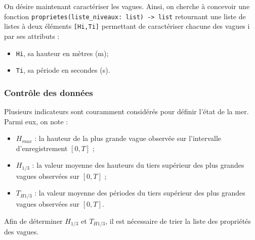 
On désire maintenant caractériser les vagues.
Ainsi, on cherche à concevoir une fonction \texttt{proprietes(liste\_niveaux: list) -> list} retournant une liste de
listes à deux éléments \texttt{[Hi,Ti]} permettant de caractériser chacune des vagues i par ses attributs :
\begin{itemize}
\item \texttt{Hi}, sa hauteur en mètres (m);
\item \texttt{Ti}, sa période en secondes (s).
\end{itemize}


\subsubsection*{Contrôle des données}
Plusieurs indicateurs sont couramment considérés pour définir l’état de la mer. Parmi eux, on
note :
\begin{itemize}
\item $H_{max}$ : la hauteur de la plus grande vague observée sur l’intervalle d’enregistrement $[0, T]$ ;
\item $H_{1/3}$ : la valeur moyenne des hauteurs du tiers supérieur des plus grandes vagues observées
sur $[0, T]$ ;
\item $T_{H1/3}$ : la valeur moyenne des périodes du tiers supérieur des plus grandes vagues observées
sur $[0, T]$.
\end{itemize}


Afin de déterminer $H_{1/3}$ et $T_{H1/3}$, il est nécessaire de trier la liste des propriétés des vagues. 

